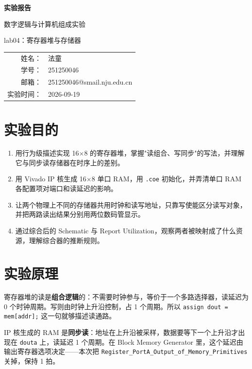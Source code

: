 \documentclass[12pt, a4paper]{ctexart}
\makeatletter
\newcommand{\coursename}{数字逻辑与计算机组成实验}
\newcommand{\expname}{lab04：寄存器堆与存储器}
\newcommand{\expdate}{2026-09-19}
\newcommand{\stuname}{法童}
\newcommand{\stuid}{251250046}
\newcommand{\stumail}{251250046@smail.nju.edu.cn}
\makeatother
\begin{document}
\begin{titlepage}
    \centering
    \vspace*{4cm}
    {\Huge\bfseries 实验报告\par}
    \vspace{1.5cm}
    {\Large \coursename\par}
    \vspace{0.8cm}
    {\Large \expname\par}
    \vspace{3cm}
    {\large
    \begin{tabular}{rl}
        姓名： & \stuname \\
        学号： & \stuid \\
        邮箱： & \stumail \\
        实验时间： & \expdate \\
    \end{tabular}\par}
\end{titlepage}

\section{实验目的}
\begin{enumerate}
    \item 用行为级描述实现 16$\times$8 的寄存器堆，掌握"读组合、写同步"的写法，并理解它与同步读存储器在时序上的差别。
    \item 用 Vivado IP 核生成 16$\times$8 单口 RAM，用 \texttt{.coe} 初始化，并弄清单口 RAM 各配置项对端口和读延迟的影响。
    \item 让两个物理上不同的存储器共用时钟和读写地址，只靠写使能区分读写对象，并把两路读出结果分别用两位数码管显示。
    \item 通过综合后的 Schematic 与 Report Utilization，观察两者被映射成了什么资源，理解综合器的推断规则。
\end{enumerate}

\section{实验原理}

寄存器堆的读是\textbf{组合逻辑}的：不需要时钟参与，等价于一个多路选择器，读延迟为 0 个时钟周期。写则由时钟上升沿控制，占 1 个周期。所以 \texttt{assign dout = mem[addr];} 这一句就够描述读通路。

IP 核生成的 RAM 是\textbf{同步读}：地址在上升沿被采样，数据要等下一个上升沿才出现在 \texttt{douta} 上，读延迟 1 个周期。在 Block Memory Generator 里，这个延迟由输出寄存器选项决定——本次把 \texttt{Register\_PortA\_Output\_of\_Memory\_Primitives} 关掉，保持 1 拍。
\end{document}
